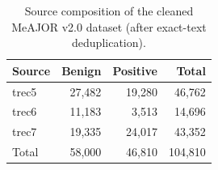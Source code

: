 
\begin{table}[!htbp]
\centering
\caption{Source composition of the cleaned MeAJOR v2.0 dataset (after exact-text deduplication).}
\label{tab:dataset}
\begin{tabular}{lrrr}
\hline\hline
Source & Benign & Positive & Total \\
\hline
trec5 & 27,482 & 19,280 & 46,762 \\
trec6 & 11,183 & 3,513 & 14,696 \\
trec7 & 19,335 & 24,017 & 43,352 \\
Total & 58,000 & 46,810 & 104,810 \\
\hline\hline
\end{tabular}
\end{table}
